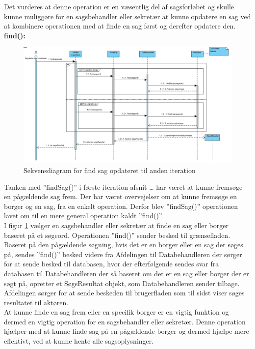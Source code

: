 Det vurderes at denne operation er en væsentlig del af sagsforløbet og skulle kunne muliggøre for en sagsbehandler eller sekretær at kunne opdatere en sag ved at kombinere operationen med at finde en sag først og derefter opdatere den. \\
\textbf{find():} \label{find}\\
\begin{figure}[htb!]
  \includegraphics[scale = 0.56]{./PNG/analyse/find.PNG} 
  \caption{Sekvensdiagram for find sag opdateret til anden iteration}
  \label{fig:2find}
\end{figure}
Tanken med ”findSag()” i første iteration afsnit … har været at kunne fremsøge en pågældende sag frem. Der har været overvejelser om at kunne fremsøge en borger og en sag, fra en enkelt operation. Derfor blev ”findSag()” operationen lavet om til en mere general operation kaldt ”find()”.\\
I figur \ref{fig:2find} vælger en sagsbehandler eller sekretær at finde en sag eller borger baseret på et søgeord. Operationen ”find()” sender besked til grænsefladen. Baseret på den pågældende søgning, hvis det er en borger eller en sag der søges på, sendes ”find()” besked videre fra Afdelingen til Databehandleren der sørger for at sende besked til databasen, hvor der efterfølgende sendes svar fra databasen til Databehandleren der så baseret om det er en sag eller borger der er søgt på, opretter et SøgsResultat objekt, som Databehandleren sender tilbage. Afdelingen sørger for at sende beskeden til brugerfladen som til sidst viser søges resultatet til aktøren. \\
At kunne finde en sag frem eller en specifik borger er en vigtig funktion og dermed en vigtig operation for en sagsbehandler eller sekretær. Denne operation hjælper med at kunne finde sag på en pågældende borger og dermed hjælpe mere effektivt, ved at kunne hente alle sagsoplysninger. \\ 
